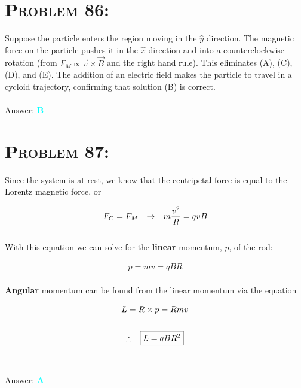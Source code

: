 \documentclass{article}
\begin{document}

\section{\textsc{Problem 86:}} Suppose the particle enters the region moving in the $\hat{y}$ direction. The magnetic force on the particle pushes it in the $\hat{x}$ direction and into a counterclockwise rotation (from $F_{M} \propto \vec{v} \times \vec{B}$ and the right hand rule). This eliminates (A), (C), (D), and (E). The addition of an electric field makes the particle to travel in a cycloid trajectory, confirming that solution (B) is correct.
\\\\
Answer: \textbf{\textcolor{cyan}B}\\


\section{\textsc{Problem 87:}} Since the system is at rest, we know that the centripetal force is equal to the Lorentz magnetic force, or

\begin{gather}
F_{C} = F_{M} \hspace{.1in} \rightarrow \hspace{.1in} m\frac{v^{2}}{R} = qvB\nonumber
\end{gather}
\\
With this equation we can solve for the \textbf{linear} momentum, $p$, of the rod:

\begin{gather}
p = mv = qBR\nonumber
\end{gather}
\\
\textbf{Angular} momentum can be found from the linear momentum via the equation

\begin{gather}
L = R \times p = Rmv\\
\nonumber\\
\therefore \hspace{.1in} \boxed{L = qBR^{2}}\nonumber
\end{gather}
\\\\
Answer: \textbf{\textcolor{cyan}A}\\
\end{document}
